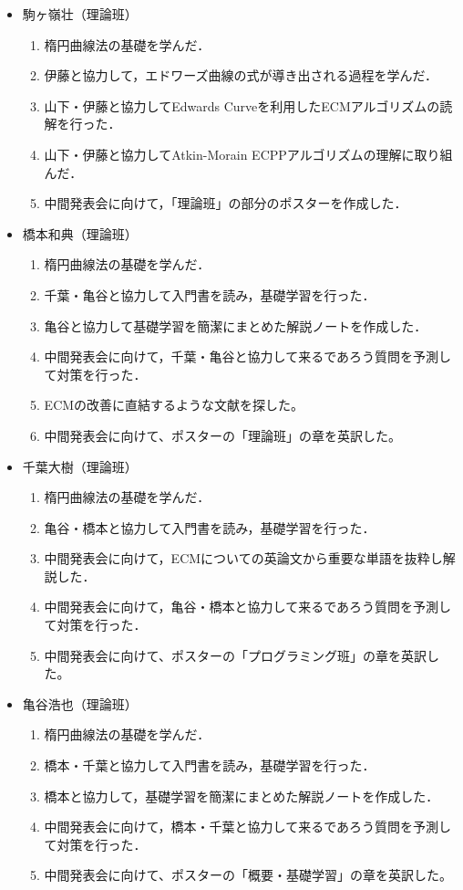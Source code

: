 \documentclass[openany,11pt,papersize]{jsbook}
\begin{document}
{\begin{itemize}
\item 駒ヶ嶺壮（理論班）
 \begin{enumerate}
 \renewcommand{\labelenumi}{(\arabic{enumi})}
 \item 楕円曲線法の基礎を学んだ．
 \item 伊藤と協力して，エドワーズ曲線の式が導き出される過程を学んだ．
 \item 山下・伊藤と協力してEdwards Curveを利用したECMアルゴリズムの読解を行った．
 \item 山下・伊藤と協力してAtkin-Morain ECPPアルゴリズムの理解に取り組んだ．
 \item 中間発表会に向けて，「理論班」の部分のポスターを作成した．
 \end{enumerate}
 
\item 橋本和典（理論班）
 \begin{enumerate}
 \renewcommand{\labelenumi}{(\arabic{enumi})}
 \item 楕円曲線法の基礎を学んだ．
 \item 千葉・亀谷と協力して入門書を読み，基礎学習を行った．
 \item 亀谷と協力して基礎学習を簡潔にまとめた解説ノートを作成した．
 \item 中間発表会に向けて，千葉・亀谷と協力して来るであろう質問を予測して対策を行った．
 \item ECMの改善に直結するような文献を探した。
 \item 中間発表会に向けて、ポスターの「理論班」の章を英訳した。
 \end{enumerate}
 
\item 千葉大樹（理論班）
 \begin{enumerate}
 \renewcommand{\labelenumi}{(\arabic{enumi})}
 \item 楕円曲線法の基礎を学んだ．
 \item 亀谷・橋本と協力して入門書を読み，基礎学習を行った．
 \item 中間発表会に向けて，ECMについての英論文から重要な単語を抜粋し解説した．
 \item 中間発表会に向けて，亀谷・橋本と協力して来るであろう質問を予測して対策を行った．
 \item 中間発表会に向けて、ポスターの「プログラミング班」の章を英訳した。
 \end{enumerate}
 
\item 亀谷浩也（理論班）
 \begin{enumerate}
 \renewcommand{\labelenumi}{(\arabic{enumi})}
 \item 楕円曲線法の基礎を学んだ．
 \item 橋本・千葉と協力して入門書を読み，基礎学習を行った．
 \item 橋本と協力して，基礎学習を簡潔にまとめた解説ノートを作成した．
 \item 中間発表会に向けて，橋本・千葉と協力して来るであろう質問を予測して対策を行った．
 \item 中間発表会に向けて、ポスターの「概要・基礎学習」の章を英訳した。
 \end{enumerate}
 

\end{itemize}}
\end{document}

